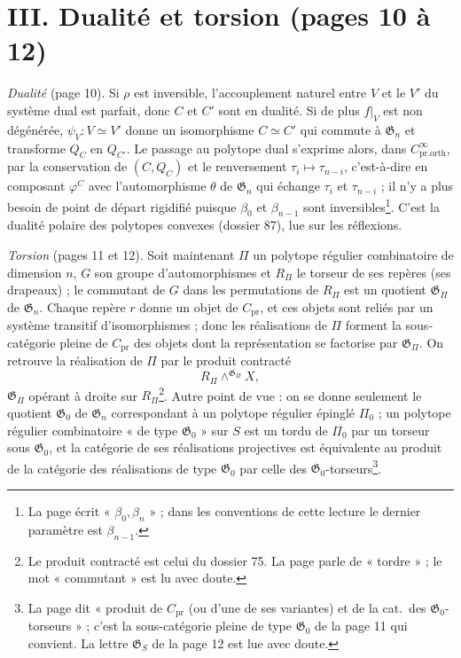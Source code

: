 \documentclass[11pt,a4paper]{article}
\begin{document}
\section*{III. Dualité et torsion (pages 10 à 12)}

\emph{Dualité} (page 10). Si $\rho$ est inversible, l'accouplement naturel
entre $V$ et le $V'$ du système dual est parfait, donc $C$ et $C'$ sont en
dualité. Si de plus $f|_V$ est non dégénérée, $\psi_V \colon V \simeq V'$
donne un isomorphisme $C \simeq C'$ qui commute à $\mathfrak{G}_n$ et
transforme $Q_C$ en $Q_{C'}$. Le passage au polytope dual s'exprime alors, dans
$C^\infty_{\mathrm{pr.orth}}$, par la conservation de $(C, Q_C)$ et le
renversement $\tau_i \mapsto \tau_{n-i}$, c'est-à-dire en composant
$\varphi^C$ avec l'automorphisme $\theta$ de $\mathfrak{G}_n$ qui échange
$\tau_i$ et $\tau_{n-i}$ ; il n'y a plus besoin de point de départ rigidifié
puisque $\beta_0$ et $\beta_{n-1}$ sont inversibles\footnote{La page écrit
« $\beta_0, \beta_n$ » ; dans les conventions de cette lecture le dernier
paramètre est $\beta_{n-1}$.}. C'est la dualité polaire des polytopes convexes
(dossier 87), lue sur les réflexions.

\emph{Torsion} (pages 11 et 12). Soit maintenant $\Pi$ un polytope régulier
combinatoire de dimension $n$, $G$ son groupe d'automorphismes et $R_\Pi$ le
torseur de ses repères (ses drapeaux) ; le commutant de $G$ dans les
permutations de $R_\Pi$ est un quotient $\mathfrak{G}_\Pi$ de $\mathfrak{G}_n$.
Chaque repère $r$ donne un objet de $C_{\mathrm{pr}}$, et ces objets sont reliés
par un système transitif d'isomorphismes ; donc les réalisations de $\Pi$
forment la sous-catégorie pleine de $C_{\mathrm{pr}}$ des objets dont la
représentation se factorise par $\mathfrak{G}_\Pi$. On retrouve la réalisation
de $\Pi$ par le produit contracté
\[
R_\Pi \wedge^{\mathfrak{G}_\Pi} X ,
\]
$\mathfrak{G}_\Pi$ opérant à droite sur $R_\Pi$\footnote{Le produit contracté
est celui du dossier 75. La page parle de « tordre » ; le mot « commutant »
est lu avec doute.}. Autre point de vue : on se donne seulement le quotient
$\mathfrak{G}_0$ de $\mathfrak{G}_n$ correspondant à un polytope régulier
épinglé $\Pi_0$ ; un polytope régulier combinatoire « de type $\mathfrak{G}_0$ »
sur $S$ est un tordu de $\Pi_0$ par un torseur sous $\mathfrak{G}_0$, et la
catégorie de ses réalisations projectives est équivalente au produit de la
catégorie des réalisations de type $\mathfrak{G}_0$ par celle des
$\mathfrak{G}_0$-torseurs\footnote{La page dit « produit de $C_{\mathrm{pr}}$
(ou d'une de ses variantes) et de la cat.\ des $\mathfrak{G}_0$-torseurs » ;
c'est la sous-catégorie pleine de type $\mathfrak{G}_0$ de la page 11 qui
convient. La lettre $\mathfrak{G}_S$ de la page 12 est lue avec doute.}.
\end{document}
